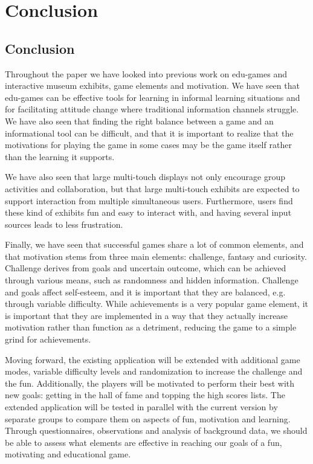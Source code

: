 \chapter{Conclusion}

\label{Chapter5}



\section{Conclusion}

Throughout the paper we have looked into previous work on edu-games and interactive museum exhibits, game elements and motivation. We have seen that edu-games can be effective tools for learning in informal learning situations and for facilitating attitude change where traditional information channels struggle. We have also seen that finding the right balance between a game and an informational tool can be difficult, and that it is important to realize that the motivations for playing the game in some cases may be the game itself rather than the learning it supports.

We have also seen that large multi-touch displays not only encourage group activities and collaboration, but that large multi-touch exhibits are expected to support interaction from multiple simultaneous users. Furthermore, users find these kind of exhibits fun and easy to interact with, and having several input sources leads to less frustration.

Finally, we have seen that successful games share a lot of common elements, and that motivation stems from three main elements: challenge, fantasy and curiosity. Challenge derives from goals and uncertain outcome, which can be achieved through various means, such as randomness and hidden information. Challenge and goals affect self-esteem, and it is important that they are balanced, e.g. through variable difficulty. While achievements is a very popular game element, it is important that they are implemented in a way that they actually increase motivation rather than function as a detriment, reducing the game to a simple grind for achievements.

Moving forward, the existing application will be extended with additional game modes, variable difficulty levels and randomization to increase the challenge and the fun. Additionally, the players will be motivated to perform their best with new goals: getting in the hall of fame and topping the high scores lists. The extended application will be tested in parallel with the current version by separate groups to compare them on aspects of fun, motivation and learning. Through questionnaires, observations and analysis of background data, we should be able to assess what elements are effective in reaching our goals of a fun, motivating and educational game.